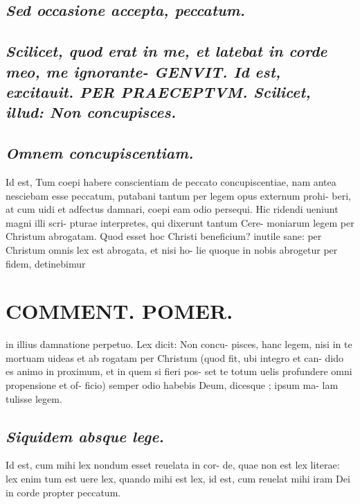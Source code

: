 \documentclass{article}
\begin{document}
\begin{pages}
\subsection*{\textit{Sed occasione accepta, peccatum. }}
{}
\subsection*{\textit{Scilicet, quod erat in me, et latebat in corde meo, me ignorante- GENVIT. Id est, excitauit.  PER PRAECEPTVM. Scilicet, illud: Non concupisces.  }}
{}
\subsection*{\textit{Omnem concupiscentiam. }}\pstart Id est, Tum coepi habere conscientiam de peccato concupiscentiae, nam antea nesciebam esse peccatum, putabani tantum per legem opus externum prohi- beri, at cum uidi et adfectus damnari, coepi eam odio persequi. Hic ridendi ueniunt magni illi scri- pturae interpretes, qui dixerunt tantum Cere- moniarum legem per Christum abrogatam.  Quod esset hoc Christi beneficium? inutile sane: per Christum omnis lex est abrogata, et nisi ho- lie quoque in nobis abrogetur per fidem, detinebimur  \pend\pstart  \pend
\section*{COMMENT. POMER.  }\pstart in illius damnatione perpetuo. Lex dicit: Non concu- pisces, hanc legem, nisi in te mortuam uideas et ab rogatam per Christum (quod fit, ubi integro et can- dido es animo in proximum, et in quem si fieri pos- set te totum uelis profundere omni propensione et of- ficio) semper odio habebis Deum, dicesque ; ipsum ma- lam tulisse legem.   \pend
{}
{}
\subsection*{\textit{Siquidem absque lege. }}\pstart Id est, cum mihi lex nondum esset reuelata in cor- de, quae non est lex literae: lex enim tum est uere lex, quando mihi est lex, id est, cum reuelat mihi iram Dei in corde propter peccatum.   \pend
{}
{}

\end{pages}
\end{document}
